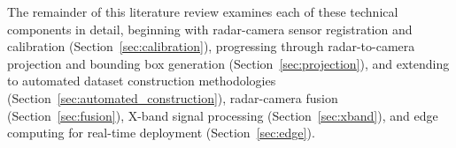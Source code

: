The remainder of this literature review examines each of these technical components in
detail, beginning with radar-camera sensor registration and calibration
(Section~\ref{sec:calibration}), progressing through radar-to-camera
projection and bounding box generation (Section~\ref{sec:projection}), and
extending to automated dataset construction methodologies
(Section~\ref{sec:automated_construction}), radar-camera fusion
(Section~\ref{sec:fusion}), X-band signal processing
(Section~\ref{sec:xband}), and edge computing for real-time deployment
(Section~\ref{sec:edge}).
